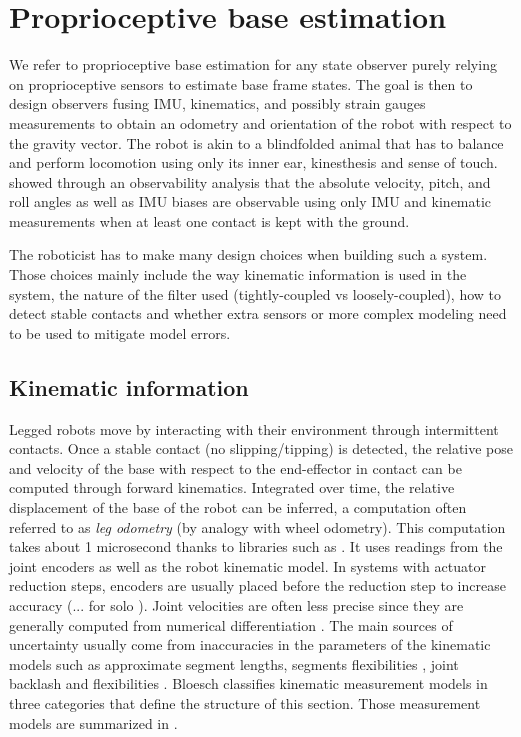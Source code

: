 \section{Proprioceptive base estimation}

We refer to proprioceptive base estimation for any state observer purely relying on proprioceptive sensors to estimate base frame states. 
The goal is then to design observers fusing IMU, kinematics, and possibly strain gauges measurements to obtain an odometry and orientation of 
the robot with respect to the gravity vector. The robot is akin to a blindfolded animal that has to balance and perform locomotion using 
only its inner ear, kinesthesis and sense of touch. \cite{bloesch2013state,rotella2014state} showed through an observability analysis 
that the absolute velocity, pitch, and roll angles as well as IMU biases are observable using only IMU and kinematic measurements when at 
least one contact is kept with the ground.

The roboticist has to make many design choices when building such a system. Those choices mainly include the way kinematic information is used in the system, 
the nature of the filter used (tightly-coupled vs loosely-coupled), how to detect stable contacts and whether extra sensors or more complex modeling need 
to be used to mitigate model errors.
 

\subsection{Kinematic information}
Legged robots move by interacting with their environment through intermittent contacts.
Once a stable contact (no slipping/tipping) is detected, the relative pose and velocity of the base with respect to the end-effector in contact 
can be computed through forward kinematics. Integrated over time, the relative displacement of the base of the robot can be inferred, a computation 
often referred to as \textit{leg odometry} (by analogy with wheel odometry). This computation takes about 1 microsecond thanks to libraries such as \cite{carpentier2019pinocchio, hereid2017frost}. It uses
readings from the joint encoders as well as the robot kinematic model. In systems with actuator reduction steps, encoders are usually placed before the reduction step 
to increase accuracy (... for solo \cite{grimminger2020open}). Joint velocities are often less precise since they are generally computed from numerical differentiation \cite{rotella2016imu}. 
The main sources of uncertainty usually come from inaccuracies in the parameters of the kinematic models such as approximate segment lengths, segments flexibilities \cite{vigne2018estimation}, 
joint backlash \cite{fallon2014drift} and flexibilities \cite{koolen2016design}. 
Bloesch \cite{bloesch2018technical} classifies kinematic measurement models in three categories that define the structure of this section. 
Those measurement models are summarized in .


